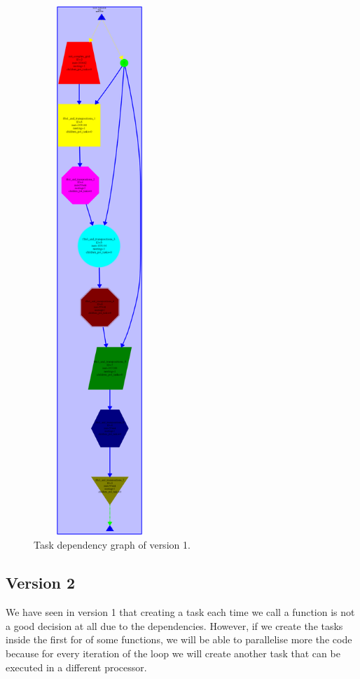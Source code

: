 \documentclass[12pt, a4paper]{article}
\begin{document}
\begin{figure}[H]
  \centering
  \includegraphics[width=5cm,height=20cm]{./images/dependency_graph_v1}
  \caption{Task dependency graph of version 1.}
  \label{dependency_graph_v1}
\end{figure}

\subsection{Version 2}

We have seen in version 1 that creating a task each time we call a function is not a good decision at all due to the dependencies. However, if we create the tasks inside the first for of some functions, we will be able to parallelise more the code because for every iteration of the loop we will create another task that can be executed in a different processor.
\end{document}
